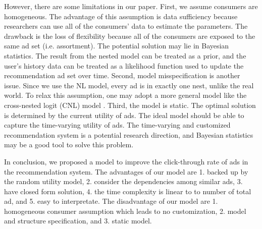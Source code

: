 \documentclass[12pt]{article}
\theoremstyle{definition}
\begin{document}
\begin{sloppypar}
However, there are some limitations in our paper. First, we assume consumers are homogeneous. The advantage of this assumption is data sufficiency because researchers can use all of the consumers' data to estimate the parameters. The drawback is the loss of flexibility because all of the consumers are exposed to the same ad set (i.e. assortment). The potential solution may lie in Bayesian statistics. The result from the nested model can be treated as a prior, and the user's history data can be treated as a likelihood function used to update the recommendation ad set over time. Second, model misspecification is another issue. Since we use the NL model, every ad is in exactly one nest, unlike the real world. To relax this assumption, one may adopt a more general model like the cross-nested logit (CNL) model \textcite{vovsha}. Third, the model is static. The optimal solution is determined by the current utility of ads. The ideal model should be able to capture the time-varying utility of ads. The time-varying and customized recommendation system is a potential research direction, and Bayesian statistics may be a good tool to solve this problem.

In conclusion, we proposed a model to improve the click-through rate of ads in the recommendation system. The advantages of our model are 1. backed up by the random utility model, 2. consider the dependencies among similar ads, 3. have closed form solution, 4. the time complexity is linear to to number of total ad, and 5. easy to interpretate. The disadvantage of our model are 1. homogeneous consumer assumption which leads to no customization, 2. model and structure specification, and 3. static model.

\printbibliography


\end{sloppypar}
\end{document}
